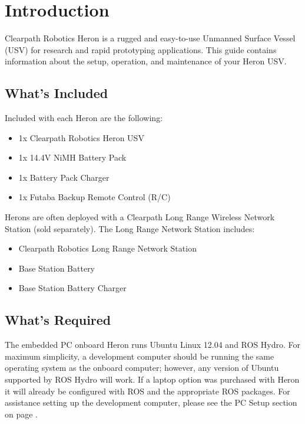 \documentclass[]{clearpath-latex/clearpath-manual}
\begin{document}
\tableofcontents

\section{Introduction}
Clearpath Robotics Heron is a rugged and easy-to-use Unmanned Surface Vessel (USV) for research and rapid prototyping applications. This guide contains information about the setup, operation, and maintenance of your Heron USV.

\subsection{What's Included}

Included with each Heron are the following:

\begin{itemize}[nolistsep]
	\item 1x Clearpath Robotics Heron USV
	\item 1x 14.4V NiMH Battery Pack
	\item 1x Battery Pack Charger
	\item 1x Futaba Backup Remote Control (R/C)
\end{itemize}

Herons are often deployed with a Clearpath Long Range Wireless Network Station (sold separately). The Long Range Network Station includes:

\begin{itemize}[nolistsep]
	\item Clearpath Robotics Long Range Network Station
	\item Base Station Battery
	\item Base Station Battery Charger
\end{itemize}

\subsection{What's Required}

The embedded PC onboard Heron runs Ubuntu Linux 12.04 and ROS Hydro. For maximum simplicity, a development computer should be running the same operating system as the onboard computer; however, any version of Ubuntu supported by ROS Hydro will work. If a laptop option was purchased with Heron it will already be configured with ROS and the appropriate ROS packages. For assistance setting up the development computer, please see the PC Setup section on page \pageref{pcsetup}.
\end{document}
